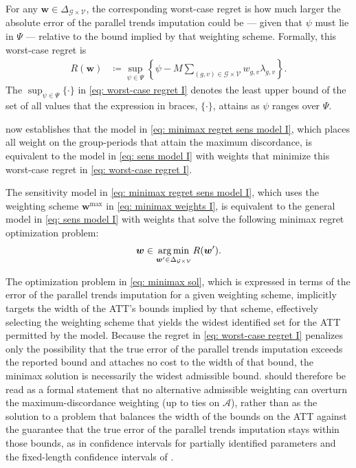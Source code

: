 \documentclass[twoside,11pt]{article}
\begin{document}
For any $\bm{w} \in \Delta_{\mathcal{G} \times \mathcal{V}}$, the corresponding worst-case regret is how much larger the absolute error of the parallel trends imputation could be --- given that $\psi$ must lie in $\Psi$ --- relative to the bound implied by that weighting scheme. Formally, this worst-case regret is
\begin{align} \label{eq: worst-case regret I}
R(\bm{w}) & \coloneqq \sup_{\psi\in\Psi} \left\{\psi - M \sum_{(g,v) \in \mathcal{G} \times \mathcal{V}} w_{g,v} \lambda_{g,v} \right\}.
\end{align}
The $\sup_{\psi\in\Psi}\{\cdot\}$ in \eqref{eq: worst-case regret I} denotes the least upper bound of the set of all values that the expression in braces, $\{\cdot\}$, attains as $\psi$ ranges over $\Psi$.

 now establishes that the model in \eqref{eq: minimax regret sens model I}, which places all weight on the group-periods that attain the maximum discordance, is equivalent to the model in \eqref{eq: sens model I} with weights that minimize this worst-case regret in \eqref{eq: worst-case regret I}.
\begin{proposition}
\label{prop: equivalence}
The sensitivity model in \eqref{eq: minimax regret sens model I}, which uses the weighting scheme $\bm{w}^{\max}$ in \eqref{eq: minimax weights I}, is equivalent to the general model in \eqref{eq: sens model I} with weights that solve the following minimax regret optimization problem:
\begin{align} \label{eq: minimax sol}
\bm{w} \in \operatorname*{arg\,min} \limits_{\bm{w}^{\prime} \in \Delta_{\mathcal{G} \times \mathcal{V}}} R(\bm{w}^{\prime}).
\end{align}
\end{proposition}
\noindent The optimization problem in \eqref{eq: minimax sol}, which is expressed in terms of the error of the parallel trends imputation for a given weighting scheme, implicitly targets the width of the \textrm{ATT}'s bounds implied by that scheme, effectively selecting the weighting scheme that yields the widest identified set for the \textrm{ATT} permitted by the model. Because the regret in \eqref{eq: worst-case regret I} penalizes only the possibility that the true error of the parallel trends imputation exceeds the reported bound and attaches no cost to the width of that bound, the minimax solution is necessarily the widest admissible bound.  should therefore be read as a formal statement that no alternative admissible weighting can overturn the maximum-discordance weighting (up to ties on $\mathcal{A}$), rather than as the solution to a problem that balances the width of the bounds on the \textrm{ATT} against the guarantee that the true error of the parallel trends imputation stays within those bounds, as in confidence intervals for partially identified parameters \citep{imbensmanski2004} and the fixed-length confidence intervals of \citet[][Section~4.3]{rambachanroth2023}.
\end{document}
